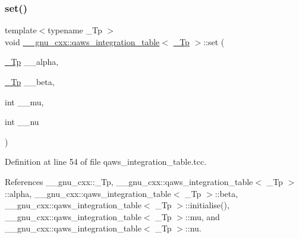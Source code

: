 \mbox{\label{struct____gnu__cxx_1_1qaws__integration__table_af94e459877f7602f68ea80d294927f1e}} 
\subsubsection{\texorpdfstring{set()}{set()}}
{\footnotesize\ttfamily template$<$typename \+\_\+\+Tp $>$ \\
void \hyperlink{struct____gnu__cxx_1_1qaws__integration__table}{\+\_\+\+\_\+gnu\+\_\+cxx\+::qaws\+\_\+integration\+\_\+table}$<$ \hyperlink{namespace____gnu__cxx_a3b19a9c800ca194374ef9172290f7d79}{\+\_\+\+Tp} $>$\+::set (\begin{DoxyParamCaption}\item[{\hyperlink{namespace____gnu__cxx_a3b19a9c800ca194374ef9172290f7d79}{\+\_\+\+Tp}}]{\+\_\+\+\_\+alpha,  }\item[{\hyperlink{namespace____gnu__cxx_a3b19a9c800ca194374ef9172290f7d79}{\+\_\+\+Tp}}]{\+\_\+\+\_\+beta,  }\item[{int}]{\+\_\+\+\_\+mu,  }\item[{int}]{\+\_\+\+\_\+nu }\end{DoxyParamCaption})}



Definition at line 54 of file qaws\+\_\+integration\+\_\+table.\+tcc.



References \+\_\+\+\_\+gnu\+\_\+cxx\+::\+\_\+\+Tp, \+\_\+\+\_\+gnu\+\_\+cxx\+::qaws\+\_\+integration\+\_\+table$<$ \+\_\+\+Tp $>$\+::alpha, \+\_\+\+\_\+gnu\+\_\+cxx\+::qaws\+\_\+integration\+\_\+table$<$ \+\_\+\+Tp $>$\+::beta, \+\_\+\+\_\+gnu\+\_\+cxx\+::qaws\+\_\+integration\+\_\+table$<$ \+\_\+\+Tp $>$\+::initialise(), \+\_\+\+\_\+gnu\+\_\+cxx\+::qaws\+\_\+integration\+\_\+table$<$ \+\_\+\+Tp $>$\+::mu, and \+\_\+\+\_\+gnu\+\_\+cxx\+::qaws\+\_\+integration\+\_\+table$<$ \+\_\+\+Tp $>$\+::nu.



